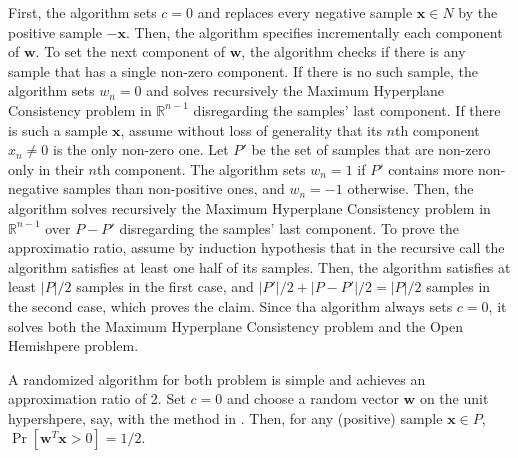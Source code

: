 \documentclass[11pt]{article}
\theoremstyle{definition}
\newcommand{\R}{\mathbb{R}}
\newcommand{\vect}[1]{\mathbf{#1}}
\begin{document}
First, the algorithm sets $c = 0$ and replaces every negative sample $\vect{x} \in N$
by the positive sample $- \vect{x}$. 
Then, the algorithm specifies incrementally each component of $\vect{w}$. 
To set the next component of $\vect{w}$, the algorithm checks if there is any sample
that has a single non-zero component. 
If there is no such sample, the algorithm sets $w_n = 0$ and solves recursively the 
Maximum Hyperplane Consistency problem in $\R^{n-1}$ disregarding the samples' last component.
If there is such a sample $\vect{x}$, 
assume without loss of generality that its $n$th component $x_n \neq 0$ is the only non-zero one.
Let $P'$ be the set of samples that are non-zero only in their $n$th component.
The algorithm sets $w_n = 1$ if $P'$ contains more non-negative samples than non-positive ones,
and $w_n = -1$ otherwise.
Then, the algorithm solves recursively the Maximum Hyperplane Consistency problem in $\R^{n-1}$ 
over $P - P'$ disregarding the samples' last component.
To prove the approximatio ratio, assume by induction hypothesis that in the recursive call
the algorithm satisfies at least one half of its samples. 
Then, the algorithm satisfies at least $|P| / 2$ samples in the first case,
and $|P'| / 2 + |P - P'| / 2 = |P| / 2$ samples in the second case, which proves the claim.
Since tha algorithm always sets $c = 0$, it solves both the Maximum Hyperplane Consistency problem
and the Open Hemishpere problem.

A randomized algorithm for both problem is simple and achieves an approximation ratio of 2. 
Set $c = 0$ and choose a random vector $\vect{w}$ on the unit hypershpere, say, with the
method in \cite{rndvect}. Then, for any (positive) sample $\vect{x} \in P$,
$\Pr [ \vect{w}^T \vect{x} > 0 ] = 1 / 2$.
\end{document}

